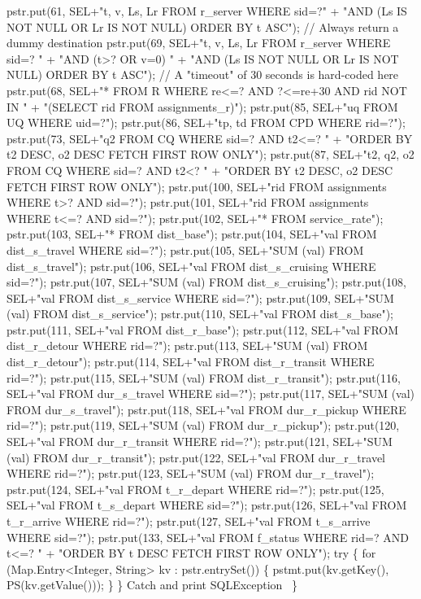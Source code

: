 \documentclass{article}
\def\nwendcode{\endtrivlist \endgroup}
\theoremstyle{definition}
\begin{document}
  pstr.put(61, SEL+"t, v, Ls, Lr FROM r_server WHERE sid=?"
      + "AND (Ls IS NOT NULL OR Lr IS NOT NULL) ORDER BY t ASC");
  // Always return a dummy destination
  pstr.put(69, SEL+"t, v, Ls, Lr FROM r_server WHERE sid=? "
      + "AND (t>? OR v=0) "
      + "AND (Ls IS NOT NULL OR Lr IS NOT NULL) ORDER BY t ASC");
  // A "timeout" of 30 seconds is hard-coded here
  pstr.put(68, SEL+"* FROM R WHERE re<=? AND ?<=re+30 AND rid NOT IN  "
      + "(SELECT rid FROM assignments_r)");
  pstr.put(85, SEL+"uq FROM UQ WHERE uid=?");
  pstr.put(86, SEL+"tp, td FROM CPD WHERE rid=?");
  pstr.put(73, SEL+"q2 FROM CQ WHERE sid=? AND t2<=? "
      + "ORDER BY t2 DESC, o2 DESC FETCH FIRST ROW ONLY");
  pstr.put(87, SEL+"t2, q2, o2 FROM CQ WHERE sid=? AND t2<? "
      + "ORDER BY t2 DESC, o2 DESC FETCH FIRST ROW ONLY");
  pstr.put(100, SEL+"rid FROM assignments WHERE t>? AND sid=?");
  pstr.put(101, SEL+"rid FROM assignments WHERE t<=? AND sid=?");
  pstr.put(102, SEL+"* FROM service_rate");
  pstr.put(103, SEL+"* FROM dist_base");
  pstr.put(104, SEL+"val FROM dist_s_travel WHERE sid=?");
  pstr.put(105, SEL+"SUM (val) FROM dist_s_travel");
  pstr.put(106, SEL+"val FROM dist_s_cruising WHERE sid=?");
  pstr.put(107, SEL+"SUM (val) FROM dist_s_cruising");
  pstr.put(108, SEL+"val FROM dist_s_service WHERE sid=?");
  pstr.put(109, SEL+"SUM (val) FROM dist_s_service");
  pstr.put(110, SEL+"val FROM dist_s_base");
  pstr.put(111, SEL+"val FROM dist_r_base");
  pstr.put(112, SEL+"val FROM dist_r_detour WHERE rid=?");
  pstr.put(113, SEL+"SUM (val) FROM dist_r_detour");
  pstr.put(114, SEL+"val FROM dist_r_transit WHERE rid=?");
  pstr.put(115, SEL+"SUM (val) FROM dist_r_transit");
  pstr.put(116, SEL+"val FROM dur_s_travel WHERE sid=?");
  pstr.put(117, SEL+"SUM (val) FROM dur_s_travel");
  pstr.put(118, SEL+"val FROM dur_r_pickup WHERE rid=?");
  pstr.put(119, SEL+"SUM (val) FROM dur_r_pickup");
  pstr.put(120, SEL+"val FROM dur_r_transit WHERE rid=?");
  pstr.put(121, SEL+"SUM (val) FROM dur_r_transit");
  pstr.put(122, SEL+"val FROM dur_r_travel WHERE rid=?");
  pstr.put(123, SEL+"SUM (val) FROM dur_r_travel");
  pstr.put(124, SEL+"val FROM t_r_depart WHERE rid=?");
  pstr.put(125, SEL+"val FROM t_s_depart WHERE sid=?");
  pstr.put(126, SEL+"val FROM t_r_arrive WHERE rid=?");
  pstr.put(127, SEL+"val FROM t_s_arrive WHERE sid=?");
  pstr.put(133, SEL+"val FROM f_status WHERE rid=? AND t<=? "
    + "ORDER BY t DESC FETCH FIRST ROW ONLY");
  try \{
    for (Map.Entry<Integer, String> kv : pstr.entrySet()) \{
      pstmt.put(kv.getKey(), PS(kv.getValue()));
    \}
  \}
  \LA{}Catch and print \code{}SQLException\edoc{}~{\nwtagstyle{}}\RA{}
\}
\eatline
{}\nwendcode{}
\end{document}
